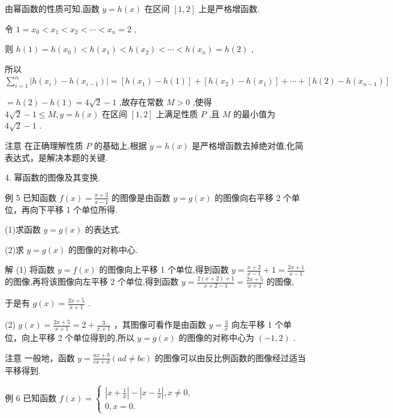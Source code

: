 \documentclass[10pt]{article}
\begin{document}
由幂函数的性质可知,函数 \(y = h\left( x\right)\) 在区间 \(\left\lbrack  {1,2}\right\rbrack\) 上是严格增函数.

令 \(1 = {x}_{0} < {x}_{1} < {x}_{2} < \cdots  < {x}_{n} = 2\) ,

则 \(h\left( 1\right)  = h\left( {x}_{0}\right)  < h\left( {x}_{1}\right)  < h\left( {x}_{2}\right)  < \cdots  < h\left( {x}_{n}\right)  = h\left( 2\right)\) ,

所以 \(\mathop{\sum }\limits_{{i = 1}}^{n}\left| {h\left( {x}_{i}\right)  - h\left( {x}_{i - 1}\right) }\right|  = \left\lbrack  {h\left( {x}_{1}\right)  - h\left( 1\right) }\right\rbrack   + \left\lbrack  {h\left( {x}_{2}\right)  - h\left( {x}_{1}\right) }\right\rbrack   + \cdots  + \left\lbrack  {h\left( 2\right)  - h\left( {x}_{n - 1}\right) }\right\rbrack\)

\(= h\left( 2\right)  - h\left( 1\right)  = 4\sqrt{2} - 1\) ,故存在常数 \(M > 0\) ,使得 \(4\sqrt{2} - 1 \leq  M,y = h\left( x\right)\) 在区间 \(\left\lbrack  {1,2}\right\rbrack\) 上满足性质 \(P\) ,且 \(M\) 的最小值为 \(4\sqrt{2} - 1\) .

注意 在正确理解性质 \(P\) 的基础上,根据 \(y = h\left( x\right)\) 是严格增函数去掉绝对值,化简表达式，是解决本题的关键.

4. 幂函数的图像及其变换.

例 5 已知函数 \(f\left( x\right)  = \frac{x + 2}{x - 1}\) 的图像是由函数 \(y = g\left( x\right)\) 的图像向右平移 2 个单位，再向下平移 1 个单位所得.

(1)求函数 \(y = g\left( x\right)\) 的表达式.

(2)求 \(y = g\left( x\right)\) 的图像的对称中心.

解 (1) 将函数 \(y = f\left( x\right)\) 的图像向上平移 1 个单位,得到函数 \(y = \frac{x + 2}{x - 1} + 1 = \frac{{2x} + 1}{x - 1}\) 的图像,再将该图像向左平移 2 个单位,得到函数 \(y = \frac{2\left( {x + 2}\right)  + 1}{x + 2 - 1} = \frac{{2x} + 5}{x + 1}\) 的图像,

于是有 \(g\left( x\right)  = \frac{{2x} + 5}{x + 1}\) .

(2) \(g\left( x\right)  = \frac{{2x} + 5}{x + 1} = 2 + \frac{3}{x + 1}\) ，其图像可看作是由函数 \(y = \frac{3}{x}\) 向左平移 1 个单位，向上平移 2 个单位得到的,所以 \(y = g\left( x\right)\) 的图像的对称中心为 \(\left( {-1,2}\right)\) .

注意 一般地，函数 \(y = \frac{{ax} + b}{{cx} + d}\left( {{ad} \neq  {bc}}\right)\) 的图像可以由反比例函数的图像经过适当平移得到.

例 6 已知函数 \(f\left( x\right)  = \left\{  \begin{array}{l} \left| {x + \frac{1}{x}}\right|  - \left| {x - \frac{1}{x}}\right| ,x \neq  0, \\  0,x = 0. \end{array}\right.\)
\end{document}
